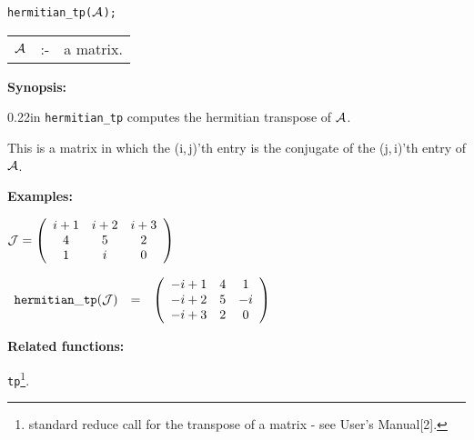 
\hspace*{0.175in} {\tt hermitian\_tp(${\cal A}$);}

\hspace*{0.1in} 
\begin{tabular}{l l l}
${\cal A}$ &:-& a matrix. 
\end{tabular}

{\bf Synopsis:} %

\begin{addtolength}{\leftskip}{0.22in}
                {\tt hermitian\_tp} computes the hermitian transpose of 
                ${\cal A}$. 

This is a matrix in which the (i,$\,$j)'th entry is the conjugate of 
the (j,$\,$i)'th entry of ${\cal A}$. 

\end{addtolength}

{\bf Examples:}

\begin{flushleft}  
\hspace*{0.175in}
\begin{math}  
{\cal J} = \left( \begin{array}{ccc} i+1 & i+2 & i+3 \\ 4 & 5 & 2 \\ 1 &
i & 0 
\end{array} \right)
\end{math}  
\end{flushleft}

\vspace*{0.1in}

\begin{flushleft}  
\hspace*{0.1in}
\begin{math}        
\begin{array}{ccc}
{\tt hermitian\_tp}({\cal J}) & = & 
\left( \begin{array}{ccc} -i+1 & 4 & 1 \\ -i+2 & 5 & -i \\-i+3 & 2 & 0
\end{array} \right)
\end{array}
\end{math}  
\end{flushleft}                   

{\bf Related functions:}

\hspace*{0.175in} {\tt tp}\footnote{standard reduce call for the 
transpose of a matrix - see {\REDUCE} User's Manual[2].}.


